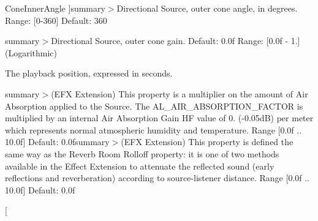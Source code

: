 \begin{Desc}
\begin{description}
{\hypertarget{namespace_open_t_k_1_1_audio_1_1_open_a_l_a04d9b7aaf9c70a9e06f053b2d98f5c46adb77bfe83e85a2c8b9fcc701d48dbe9a}{Cone\-Inner\-Angle}\label{namespace_open_t_k_1_1_audio_1_1_open_a_l_a04d9b7aaf9c70a9e06f053b2d98f5c46adb77bfe83e85a2c8b9fcc701d48dbe9a}
}]summary$>$Directional Source, outer cone angle, in degrees. Range\-: \mbox{[}0-\/360\mbox{]} Default\-: 360\item[{\em 
\hypertarget{namespace_open_t_k_1_1_audio_1_1_open_a_l_a04d9b7aaf9c70a9e06f053b2d98f5c46a1e29896512ffbc4001df3bfa13751939}{Cone\-Outer\-Angle}\label{namespace_open_t_k_1_1_audio_1_1_open_a_l_a04d9b7aaf9c70a9e06f053b2d98f5c46a1e29896512ffbc4001df3bfa13751939}
}]summary$>$Directional Source, outer cone gain. Default\-: 0.\-0f Range\-: \mbox{[}0.\-0f -\/ 1.\mbox{]} (Logarithmic)\item[{\em 
\hypertarget{namespace_open_t_k_1_1_audio_1_1_open_a_l_a04d9b7aaf9c70a9e06f053b2d98f5c46a97bbb27bb36b9c6a7efacbbcbdbd68ac}{Sec\-Offset}\label{namespace_open_t_k_1_1_audio_1_1_open_a_l_a04d9b7aaf9c70a9e06f053b2d98f5c46a97bbb27bb36b9c6a7efacbbcbdbd68ac}
}]The playback position, expressed in seconds.\item[{\em 
\hypertarget{namespace_open_t_k_1_1_audio_1_1_open_a_l_a04d9b7aaf9c70a9e06f053b2d98f5c46a8470960f446d265ed8a5ec0ed29b94d9}{Efx\-Air\-Absorption\-Factor}\label{namespace_open_t_k_1_1_audio_1_1_open_a_l_a04d9b7aaf9c70a9e06f053b2d98f5c46a8470960f446d265ed8a5ec0ed29b94d9}
}]summary$>$(E\-F\-X Extension) This property is a multiplier on the amount of Air Absorption applied to the Source. The A\-L\-\_\-\-A\-I\-R\-\_\-\-A\-B\-S\-O\-R\-P\-T\-I\-O\-N\-\_\-\-F\-A\-C\-T\-O\-R is multiplied by an internal Air Absorption Gain H\-F value of 0. (-\/0.\-05d\-B) per meter which represents normal atmospheric humidity and temperature. Range \mbox{[}0.\-0f .. 10.\-0f\mbox{]} Default\-: 0.\-0fsummary$>$(E\-F\-X Extension) This property is defined the same way as the Reverb Room Rolloff property\-: it is one of two methods available in the Effect Extension to attenuate the reflected sound (early reflections and reverberation) according to source-\/listener distance. Range \mbox{[}0.\-0f .. 10.\-0f\mbox{]} Default\-: 0.\-0f\item[{\em 
}
\end{description}
\end{Desc}
